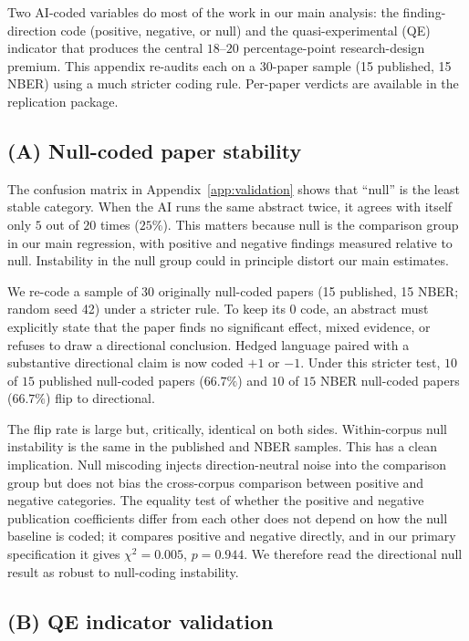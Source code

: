 \documentclass[12pt]{article}
\begin{document}
Two AI-coded variables do most of the work in our main analysis: the
finding-direction code (positive, negative, or null) and the
quasi-experimental (QE) indicator that produces the central
$18$--$20$ percentage-point research-design premium.  This appendix
re-audits each on a 30-paper sample (15 published, 15 NBER) using a
much stricter coding rule.  Per-paper verdicts are available in the
replication package.

\subsection*{(A) Null-coded paper stability}

The confusion matrix in Appendix~\ref{app:validation} shows that
``null'' is the least stable category.  When the AI runs the same
abstract twice, it agrees with itself only $5$ out of $20$ times
($25\%$).  This matters because null is the comparison group in our
main regression, with positive and negative findings measured
relative to null.  Instability in the null group could in
principle distort our main estimates.

We re-code a sample of 30 originally null-coded papers (15 published,
15 NBER; random seed 42) under a stricter rule.  To keep its $0$ code,
an abstract must explicitly state that the paper finds no significant
effect, mixed evidence, or refuses to draw a directional conclusion.
Hedged language paired with a substantive directional claim is now
coded $+1$ or $-1$.  Under this stricter test, $10$ of $15$ published
null-coded papers ($66.7\%$) and $10$ of $15$ NBER null-coded papers
($66.7\%$) flip to directional.

The flip rate is large but, critically, identical on both sides.
Within-corpus null instability is the same in the published and NBER
samples.  This has a clean implication.  Null miscoding injects
direction-neutral noise into the comparison group but does not bias
the cross-corpus comparison between positive and negative categories.
The equality test of whether the positive and negative publication
coefficients differ from each other does not depend on how the null
baseline is coded; it compares positive and negative directly, and in
our primary specification it gives $\chi^2 = 0.005$, $p = 0.944$.  We
therefore read the directional null result as robust to null-coding
instability.

\subsection*{(B) QE indicator validation}
\end{document}
